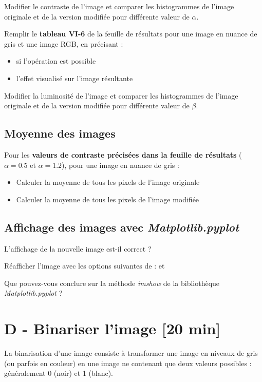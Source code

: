 \Manip Modifier le contraste de l'image et comparer les histogrammes de l'image originale et de la version modifiée pour différente valeur de $\alpha$.

\Manip Remplir le \textbf{tableau VI-6} de la feuille de résultats pour une image en nuance de gris et une image RGB, en précisant : 
\begin{itemize}
	\item si l'opération est possible
	\item l'effet visualisé sur l'image résultante
\end{itemize}

\Manip Modifier la luminosité de l'image et comparer les histogrammes de l'image originale et de la version modifiée pour différente valeur de $\beta$. 

\subsection{Moyenne des images}

\Manip Pour les \textbf{valeurs de contraste précisées dans la feuille de résultats} ($\alpha = 0.5$ et $\alpha = 1.2$), pour une image en nuance de gris :

\begin{itemize}
	\item Calculer la moyenne de tous les pixels de l'image originale
	\item Calculer la moyenne de tous les pixels de l'image modifiée
\end{itemize} 

\subsection{Affichage des images avec \textit{Matplotlib.pyplot}}

\Quest L'affichage de la nouvelle image est-il correct ?

\Manip Réafficher l'image avec les options suivantes de  :  et 

\Quest Que pouvez-vous conclure sur la méthode \textit{imshow} de la bibliothèque \textit{Matplotlib.pyplot} ? 

\newpage
\section{D - Binariser l'image {[20 min]}}

La binarisation d'une image consiste à transformer une image en niveaux de gris (ou parfois en couleur) en une image ne contenant que deux valeurs possibles : généralement 0 (noir) et 1 (blanc).

